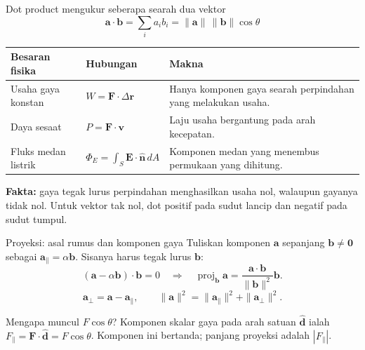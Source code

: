 \documentclass[11pt,aspectratio=169]{beamer}
\newcommand{\vect}[1]{\boldsymbol{#1}}
\DeclareMathOperator{\proj}{proj}
\begin{document}
\begin{frame}{Dot product mengukur seberapa searah dua vektor}
\[
\boxed{\vect{a}\cdot\vect{b}=\sum_i a_i b_i
=\|\vect{a}\|\,\|\vect{b}\|\cos\theta}
\]
\small
\renewcommand{\arraystretch}{1.25}
\begin{tabular}{@{}>{\raggedright\arraybackslash}p{}>{\raggedright\arraybackslash}p{}>{\raggedright\arraybackslash}p{}@{}}
\toprule
\textbf{Besaran fisika} & \textbf{Hubungan} & \textbf{Makna}\\
\midrule
Usaha gaya konstan & $W=\vect{F}\cdot\Delta\vect{r}$ & Hanya komponen gaya searah perpindahan yang melakukan usaha.\\
Daya sesaat & $P=\vect{F}\cdot\vect{v}$ & Laju usaha bergantung pada arah kecepatan.\\
Fluks medan listrik & $\Phi_E=\int_S\vect{E}\cdot\widehat{\vect{n}}\,dA$ & Komponen medan yang menembus permukaan yang dihitung.\\
\bottomrule
\end{tabular}
\medskip
\textbf{Fakta:} gaya tegak lurus perpindahan menghasilkan usaha nol,
walaupun gayanya tidak nol. Untuk vektor tak nol, dot positif pada sudut lancip dan negatif pada sudut tumpul.
\end{frame}

\begin{frame}{Proyeksi: asal rumus dan komponen gaya}
Tuliskan komponen $\vect{a}$ sepanjang $\vect{b}\ne\vect{0}$ sebagai
$\vect{a}_{\parallel}=\alpha\vect{b}$. Sisanya harus tegak lurus $\vect{b}$:
\[
(\vect{a}-\alpha\vect{b})\cdot\vect{b}=0
\quad\Longrightarrow\quad
\boxed{\proj_{\vect{b}}\vect{a}
=\frac{\vect{a}\cdot\vect{b}}{\|\vect{b}\|^2}\vect{b}}.
\]
\[
\vect{a}_{\perp}=\vect{a}-\vect{a}_{\parallel},\qquad
\|\vect{a}\|^2=\|\vect{a}_{\parallel}\|^2+\|\vect{a}_{\perp}\|^2.
\]
\begin{block}{Mengapa muncul $F\cos\theta$?}
Komponen skalar gaya pada arah satuan $\widehat{\vect{d}}$ ialah
$F_{\parallel}=\vect{F}\cdot\widehat{\vect{d}}=F\cos\theta$.
Komponen ini bertanda; panjang proyeksi adalah $|F_{\parallel}|$.
\end{block}
\end{frame}
\end{document}
